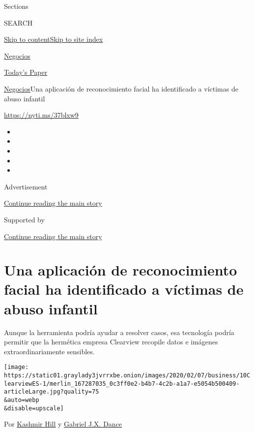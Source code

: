 Sections

SEARCH

\protect\hyperlink{site-content}{Skip to
content}\protect\hyperlink{site-index}{Skip to site index}

\href{https://www.nytimes3xbfgragh.onion/es/section/negocios}{Negocios}

\href{https://myaccount.nytimes3xbfgragh.onion/auth/login?response_type=cookie\&client_id=vi}{}

\href{https://www.nytimes3xbfgragh.onion/section/todayspaper}{Today's
Paper}

\href{/es/section/negocios}{Negocios}\textbar{}Una aplicación de
reconocimiento facial ha identificado a víctimas de abuso infantil

\url{https://nyti.ms/37blxw9}

\begin{itemize}
\item
\item
\item
\item
\item
\end{itemize}

Advertisement

\protect\hyperlink{after-top}{Continue reading the main story}

Supported by

\protect\hyperlink{after-sponsor}{Continue reading the main story}

\hypertarget{una-aplicaciuxf3n-de-reconocimiento-facial-ha-identificado-a-vuxedctimas-de-abuso-infantil}{%
\section{Una aplicación de reconocimiento facial ha identificado a
víctimas de abuso
infantil}\label{una-aplicaciuxf3n-de-reconocimiento-facial-ha-identificado-a-vuxedctimas-de-abuso-infantil}}

Aunque la herramienta podría ayudar a resolver casos, esa tecnología
podría permitir que la hermética empresa Clearview recopile datos e
imágenes extraordinariamente sensibles.

\texttt{[image: https://static01.graylady3jvrrxbe.onion/images/2020/02/07/business/10ClearviewES-1/merlin\_167287035\_0c3ff0e2-b4b7-4c2b-a1a7-e5054b500409-articleLarge.jpg?quality=75\\\&auto=webp\\\&disable=upscale]}

Por \href{https://www.nytimes3xbfgragh.onion/by/kashmir-hill}{Kashmir
Hill} y
\href{https://www.nytimes3xbfgragh.onion/by/gabriel-dance}{Gabriel J.X.
Dance}


